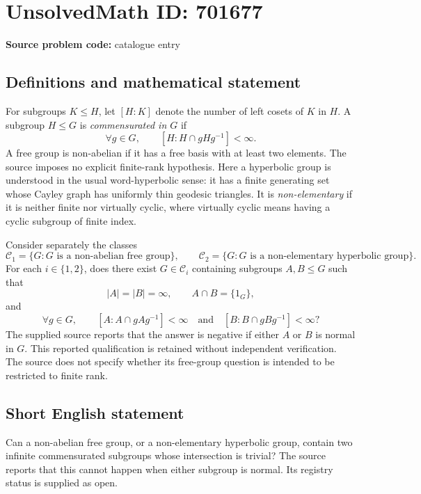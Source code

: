 \documentclass[11pt]{article}
\begin{document}
\section*{UnsolvedMath ID: 701677}
\textbf{Source problem code:} catalogue entry
\subsection{Definitions and mathematical statement}
For subgroups \(K\leq H\), let \([H:K]\) denote the number of left cosets of \(K\) in \(H\). A subgroup \(H\leq G\) is \emph{commensurated in \(G\)} if
\[
\forall g\in G,\qquad [H:H\cap gHg^{-1}]<\infty.
\]
A free group is non-abelian if it has a free basis with at least two elements. The source imposes no explicit finite-rank hypothesis. Here a hyperbolic group is understood in the usual word-hyperbolic sense: it has a finite generating set whose Cayley graph has uniformly thin geodesic triangles. It is \emph{non-elementary} if it is neither finite nor virtually cyclic, where virtually cyclic means having a cyclic subgroup of finite index.

Consider separately the classes
\[
\mathcal C_1=\{G:G\text{ is a non-abelian free group}\},\qquad
\mathcal C_2=\{G:G\text{ is a non-elementary hyperbolic group}\}.
\]
For each \(i\in\{1,2\}\), does there exist \(G\in\mathcal C_i\) containing subgroups \(A,B\leq G\) such that
\[
|A|=|B|=\infty,\qquad A\cap B=\{1_G\},
\]
and
\[
\forall g\in G,\qquad
[A:A\cap gAg^{-1}]<\infty
\quad\text{and}\quad
[B:B\cap gBg^{-1}]<\infty?
\]
The supplied source reports that the answer is negative if either \(A\) or \(B\) is normal in \(G\). This reported qualification is retained without independent verification. The source does not specify whether its free-group question is intended to be restricted to finite rank.
\subsection{Short English statement}
Can a non-abelian free group, or a non-elementary hyperbolic group, contain two infinite commensurated subgroups whose intersection is trivial? The source reports that this cannot happen when either subgroup is normal. Its registry status is supplied as open.
\end{document}

